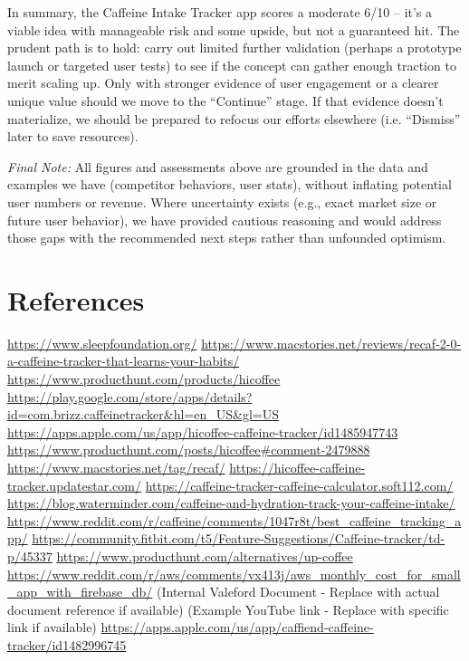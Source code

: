 \documentclass{article}
\begin{document}
In summary, the Caffeine Intake Tracker app scores a moderate 6/10 – it’s a viable idea with manageable risk and some upside, but not a guaranteed hit. The prudent path is to hold: carry out limited further validation (perhaps a prototype launch or targeted user tests) to see if the concept can gather enough traction to merit scaling up. Only with stronger evidence of user engagement or a clearer unique value should we move to the “Continue” stage. If that evidence doesn’t materialize, we should be prepared to refocus our efforts elsewhere (i.e. “Dismiss” later to save resources).

\textit{Final Note:} All figures and assessments above are grounded in the data and examples we have (competitor behaviors, user stats)\footnotemark[1, 5], without inflating potential user numbers or revenue. Where uncertainty exists (e.g., exact market size or future user behavior), we have provided cautious reasoning and would address those gaps with the recommended next steps rather than unfounded optimism.

\newpage
\section{References}
\renewcommand{\footnotesize}{\fontsize{9}{11}\selectfont}
\footnotesize
\noindent{} \url{https://www.sleepfoundation.org/}
\noindent{} \url{https://www.macstories.net/reviews/recaf-2-0-a-caffeine-tracker-that-learns-your-habits/}
\noindent{} \url{https://www.producthunt.com/products/hicoffee}
\noindent{} \url{https://play.google.com/store/apps/details?id=com.brizz.caffeinetracker\&hl=en_US\&gl=US}
\noindent{} \url{https://apps.apple.com/us/app/hicoffee-caffeine-tracker/id1485947743}
\noindent{} \url{https://www.producthunt.com/posts/hicoffee#comment-2479888}
\noindent{} \url{https://www.macstories.net/tag/recaf/}
\noindent{} \url{https://hicoffee-caffeine-tracker.updatestar.com/}
\noindent{} \url{https://caffeine-tracker-caffeine-calculator.soft112.com/}
\noindent{} \url{https://blog.waterminder.com/caffeine-and-hydration-track-your-caffeine-intake/}
\noindent{} \url{https://www.reddit.com/r/caffeine/comments/1047r8t/best_caffeine_tracking_app/}
\noindent{} \url{https://community.fitbit.com/t5/Feature-Suggestions/Caffeine-tracker/td-p/45337}
\noindent{} \url{https://www.producthunt.com/alternatives/up-coffee}
\noindent{} \url{https://www.reddit.com/r/aws/comments/vx413j/aws_monthly_cost_for_small_app_with_firebase_db/}
\noindent{} (Internal Valeford Document - Replace with actual document reference if available)
\noindent{} (Example YouTube link - Replace with specific link if available)
\noindent{} \url{https://apps.apple.com/us/app/caffiend-caffeine-tracker/id1482996745}
\end{document}
